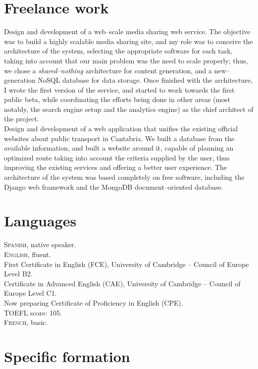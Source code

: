 \documentclass[11pt, a4paper]{article}
\newcommand{\years}[1]{\marginnote{\scriptsize #1}}
\begin{document}
\section*{Freelance work} %
\noindent
\years{2010--present}Design and development of a web--scale media sharing web service. The objective was to build a highly scalable media sharing site, and my role was to conceive the architecture of the system, selecting the appropriate software for each task, taking into account that our main problem was the need to scale properly; thus, we chose a \textit{shared--nothing} architecture for content generation, and a new--generation NoSQL database for data storage. Once finished with the architecture, I wrote the first version of the service, and started to work towards the first public beta, while coordinating the efforts being done in other areas (most notably, the search engine setup and the analytics engine) as the chief architect of the project.\\
\years{2011}Design and development of a web application that unifies the existing official websites about public transport in Cantabria. We built a database from the available information, and built a website around it, capable of planning an optimized route taking into account the criteria supplied by the user, thus improving the existing services and offering a better user experience. The architecture of the system was based completely on free software, including the Django web framework and the MongoDB document--oriented database.


\section*{Languages} %
\noindent
\textsc{Spanish}, native speaker.\\

\textsc{English}, fluent.\\
First Certificate in English (FCE), University of Cambridge -- Council of Europe Level B2.\\
Certificate in Advanced English (CAE), University of Cambridge -- Council of Europe Level C1.\\
Now preparing Certificate of Proficiency in English (CPE).\\
TOEFL score: 105.\\

\textsc{French}, basic.


\section*{Specific formation} %
\end{document}
